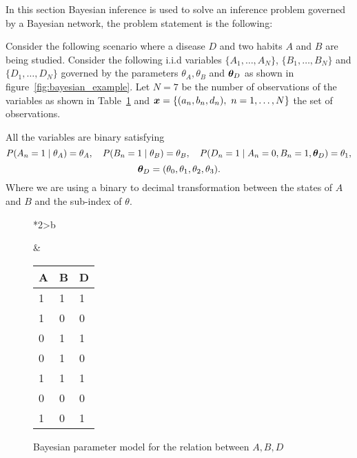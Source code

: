 In this section Bayesian inference is used to solve an inference problem governed by a Bayesian network, the problem statement is the following:

Consider the following scenario where a disease \(D\) and two habits \(A\) and \(B\) are being studied.  Consider the following i.i.d variables \(\{A_{1},\dots, A_{N}\}\), \(\{B_{1},\dots,B_{N}\}\) and \(\{D_{1},\dots, D_{N}\}\) governed by the parameters \(\theta_{A}, \theta_{B}\) and \(\btheta_{D}\) as shown in figure~\ref{fig:bayesian_example}. Let \(N = 7\) be the number of observations of the variables as shown in Table~\ref{tab:bn_ex} and \( \bm{x} = \{(a_n, b_n, d_n),\ n=1,\dots,N\} \) the set of observations.

All the variables are binary satisfying
\[
  P(A_{n} = 1 \mid \theta_{A}) = \theta_{A}, \quad P(B_{n} = 1 \mid \theta_{B}) = \theta_{B}, \quad P(D_{n} = 1 \mid A_{n} = 0, B_{n} = 1, \bm{\theta}_{D}) = \theta_{1},
\]
\[
  \bm{\theta}_{D} = ( \theta_{0}, \theta_{1}, \theta_{2},\theta_{3}).
\]
Where we are using a binary to decimal transformation between the states of \(A\) and \(B\) and the sub-index of \(\theta\).

\begin{figure}[!ht]
  \begin{tabular}{*{2}{>{\centering\arraybackslash}b{}}}
  \centering
  \begin{tikzpicture}[
    node distance=1cm and 0.5cm,
    mynode/.style={draw,circle,text width=0.5cm,align=center}
    ]

    \node[mynode] (d) {\(D_{n}\)};
    \node[mynode, above left=of d] (a) {\(A_{n}\)};
    \node[mynode, above right=of d] (b) {\(B_{n}\)};
    \node[mynode, above=of a] (ta) {\(\theta_{A}\)};
    \node[mynode, above=of b] (tb) {\(\theta_{B}\)};
    \node[mynode, below=of d] (td) {\(\btheta_{D}\)};
    \plate[inner sep=.3cm,xshift=.02cm,yshift=.2cm]  {} {(d)(a)(b)} {\(n= 1\dots N\)}; %
    \path (a) edge[-latex] (d)
    (b) edge[-latex] (d)
    (ta) edge[-latex] (a)
    (tb) edge[-latex] (b)
    (td) edge[-latex] (d)
    ;

  \end{tikzpicture}
    \caption{Bayesian parameter model for the relation between \(A,B,D\)}\label{fig:bayesian_example}
    &
      \renewcommand{\arraystretch}{1.3}
      \begin{tabular}{|l|l|l|}
    \hline
    A & B & D \\ \hline
    1 & 1 & 1 \\ \hline
    1 & 0 & 0 \\ \hline
    0 & 1 & 1 \\ \hline
    0 & 1 & 0 \\ \hline
    1 & 1 & 1 \\ \hline
    0 & 0 & 0 \\ \hline
    1 & 0 & 1 \\ \hline
  \end{tabular}\label{tab:bn_ex}
\end{tabular}
\end{figure}

